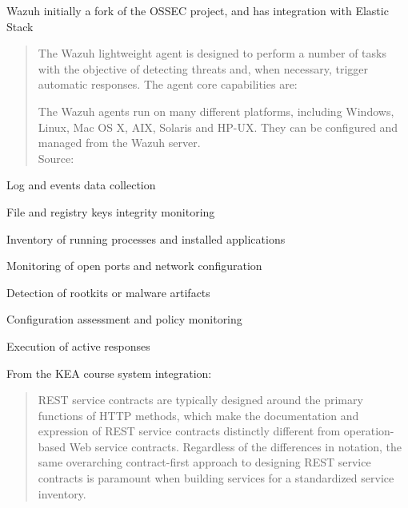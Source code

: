 \documentclass[Screen16to9,17pt]{foils}
\begin{document}
\begin{list2}
\item Wazuh initially a fork of the OSSEC project, and has integration with Elastic Stack
\end{list2}



\begin{quote}\small
The Wazuh lightweight agent is designed to perform a number of tasks with the objective of detecting threats and, when necessary, trigger automatic responses. The agent core capabilities are:

The Wazuh agents run on many different platforms, including Windows, Linux, Mac OS X, AIX, Solaris and HP-UX. They can be configured and managed from the Wazuh server.\\
Source: 
\end{quote}

\begin{list2}
\item Log and events data collection
\item File and registry keys integrity monitoring
\item Inventory of running processes and installed applications
\item Monitoring of open ports and network configuration
\item Detection of rootkits or malware artifacts
\item Configuration assessment and policy monitoring
\item Execution of active responses
\end{list2}






From the KEA course system integration:
\begin{quote}
REST service contracts are typically designed around the primary functions of HTTP methods, which make the documentation and expression of REST service contracts distinctly different from operation-based Web service contracts. Regardless of the differences in notation, the same overarching contract-first approach to designing REST service contracts is paramount when building services for a standardized service inventory.
\end{quote}
\end{document}
